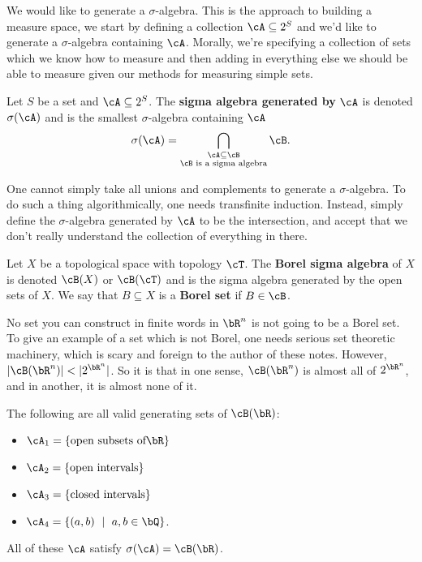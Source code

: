  We would like to generate a $\sigma$-algebra. This is the approach to building a measure space, we start by defining a collection $\cA \subseteq 2^S$ and we'd like to generate a $\sigma$-algebra containing $\cA$. Morally, we're specifying a collection of sets which we know how to measure and then adding in everything else we should be able to measure given our methods for measuring simple sets.
\begin{defn}\label{defn:generate-sigma-alg}
  Let $S$ be a set and $\cA \subseteq 2^S$. The \textbf{sigma algebra generated by} $\cA$ is denoted $\sigma(\cA)$ and is the smallest $\sigma$-algebra containing $\cA$
  \begin{align*}
    \sigma(\cA) = \bigcap_{\substack{\cA \subseteq \cB \\ \cB \text{ is a sigma algebra}}} \cB.
  \end{align*}
\end{defn}
\begin{rmk}\label{rmk:need-transfinite-induction}
  One cannot simply take all unions and complements to generate a $\sigma$-algebra. To do such a thing algorithmically, one needs transfinite induction. Instead, simply define the $\sigma$-algebra generated by $\cA$ to be the intersection, and accept that we don't really understand the collection of everything in there.
\end{rmk}
\begin{defn}\label{defn:borel-sigma-algebra}
  Let $X$ be a topological space with topology $\cT$. The \textbf{Borel sigma algebra} of $X$ is denoted $\cB(X)$ or $\cB(\cT)$ and is the sigma algebra generated by the open sets of $X$. We say that $B \subseteq X$ is a \textbf{Borel set} if $B \in \cB$.
\end{defn}
\begin{rmk}\label{rmk:borel-set}
  No set you can construct in finite words in $\bR^n$ is not going to be a Borel set. To give an example of a set which is not Borel, one needs serious set theoretic machinery, which is scary and foreign to the author of these notes. However, $|\cB(\bR^n)| < |2^{\bR^n}|$. So it is that in one sense, $\cB(\bR^n)$ is almost all of $2^{\bR^n}$, and in another, it is almost none of it.
\end{rmk}

\begin{example}\label{example:various-generators-for-borel-R}
  The following are all valid generating sets of $\cB(\bR)$:
  \begin{itemize}
    \item $\cA_1 = \{\text{open subsets of} \bR\}$
    \item $\cA_2 = \{\text{open intervals}\}$
    \item $\cA_3 = \{\text{closed intervals}\}$
    \item $\cA_4 = \{(a,b) ~\mid~ a,b \in \bQ\}$.
  \end{itemize}
  All of these $\cA$ satisfy $\sigma(\cA) = \cB(\bR)$.
\end{example}

